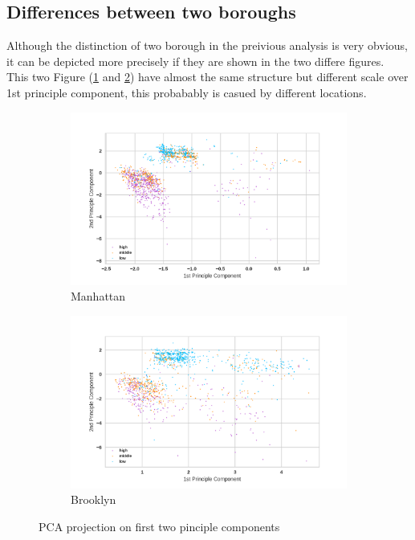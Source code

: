 \documentclass[12pt]{article}
\begin{document}
\subsection{Differences between two boroughs}
Although the distinction of two borough in the preivious analysis is very obvious, it can be depicted more precisely if they are shown in the two differe figures.\\
This two Figure (\ref{fig:pca3-1} and \ref{fig:pca3-2}) have almost the same structure but different scale over 1st principle component, this probabably is casued by different locations.
\begin{figure}
    \centering
    \begin{subfigure}[b]{0.47\textwidth}
        \includegraphics[width=\textwidth]{images/pca3-1.png}
        \caption{Manhattan}
        \label{fig:pca3-1}
    \end{subfigure}
    \begin{subfigure}[b]{0.47\textwidth}
        \includegraphics[width=\textwidth]{images/pca3-2.png}
        \caption{Brooklyn}
        \label{fig:pca3-2}
    \end{subfigure}
    \caption{PCA projection on first two pinciple components}\label{fig:pca3}
\end{figure} 
\end{document}
